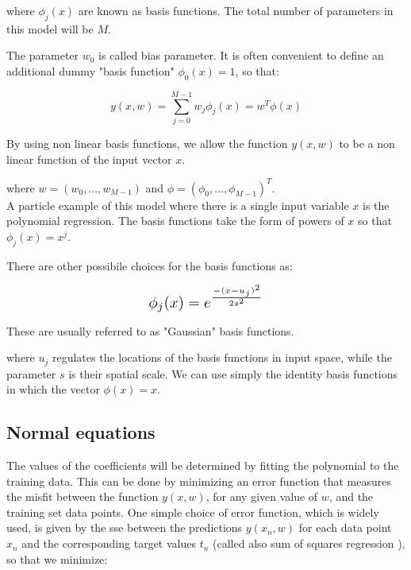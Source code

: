 \noindent where $\phi_j(x)$ are known as basis functions. The total number of parameters in this model will be $M$.

\noindent The parameter $w_0$ is called bias parameter. It is often convenient to define an additional dummy "basis function" $\phi_0(x)=1$, so that:

\begin{Equation}[H]
	\centering
	\begin{equation} \label{eq:vectlincomb}
		y(x,w)=\sum_{j=0}^{M-1}w_j \phi_j(x) = w^T\phi(x)
	\end{equation}
	\caption[Linear combinations of fixed nonlinear basis functions.]{By using non linear basis functions, we allow the function $y(x,w)$ to be a non linear function of the input vector $x$.}
\end{Equation}

\noindent where $w=(w_0,...,w_{M-1})$ and $\phi=(\phi_0,...,\phi_{M-1})^T$. \\

\noindent A particle example of this model where there is a single input variable $x$ is the polynomial regression. The basis functions take the form of powers of $x$ so that $\phi_j(x)=x^j$.

\noindent There are other possibile choices for the basis functions as:

\begin{Equation}[H]
	\centering
	\begin{equation} \label{eq:gausbasfun}
		\resizebox{.3\hsize}{!}{$ \phi_j(x)=e^{\frac{-(x-u_j)^2}{2s^2}} $}
	\end{equation}
	\caption[Gaussian basis function.]{These are usually referred to as "Gaussian" basis functions.}
\end{Equation}

\noindent where $u_j$ regulates the locations of the basis functions in input space, while the parameter $s$ is their spatial scale.
\noindent We can use simply the identity basis functions in which the vector $\phi(x)=x$.

\subsection{Normal equations}
\label{subsec:reglinmulnormeq}
The values of the coefficients will be determined by fitting the polynomial to the training data. This can be done by minimizing an error function that measures the misfit between the function $y(x, w)$, for any given value of $w$, and the training set data points. One simple choice of error function, which is widely used, is given by the \gls{sse} between the predictions $y(x_n, w)$ for each data point $x_n$ and the corresponding target values $t_n$ (called also sum of squares regression \cite[]{sum-squares}), so that we minimize:


